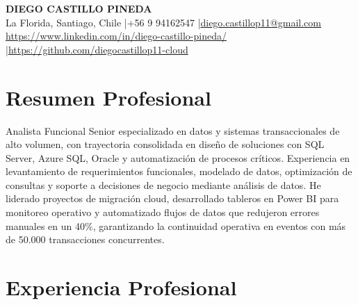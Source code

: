 \documentclass[11pt,letterpaper]{article}
\begin{document}
\begin{center}
{\fontsize{16}{19}\selectfont\textbf{\MakeUppercase{Diego Castillo Pineda}}}\\[4pt]
{\small La Florida, Santiago, Chile \quad|\quad +56 9 94162547 \quad|\quad \href{mailto:diego.castillop11@gmail.com}{diego.castillop11@gmail.com}\\
\href{https://https://www.linkedin.com/in/diego-castillo-pineda/}{https://www.linkedin.com/in/diego-castillo-pineda/} \quad|\quad \href{https://https://github.com/diegocastillop11-cloud}{https://github.com/diegocastillop11-cloud}}
\end{center}

\section{Resumen Profesional}
Analista Funcional Senior especializado en datos y sistemas transaccionales de alto volumen, con trayectoria consolidada en diseño de soluciones con SQL Server, Azure SQL, Oracle y automatización de procesos críticos. Experiencia en levantamiento de requerimientos funcionales, modelado de datos, optimización de consultas y soporte a decisiones de negocio mediante análisis de datos. He liderado proyectos de migración cloud, desarrollado tableros en Power BI para monitoreo operativo y automatizado flujos de datos que redujeron errores manuales en un 40\%, garantizando la continuidad operativa en eventos con más de 50.000 transacciones concurrentes.

\section{Experiencia Profesional}
\end{document}

